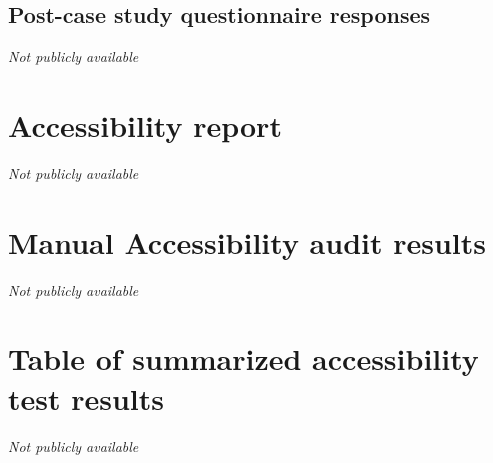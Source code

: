 \documentclass{master_thesis}
\begin{document}
\subsection{Post-case study questionnaire responses}\label{appendix:post-survey-responses}
\textit{Not publicly available}

\section{Accessibility report}\label{appendix:report}
\textit{Not publicly available}

\section{Manual Accessibility audit results}\label{appendix:manual-audit}
\textit{Not publicly available}

\section{Table of summarized accessibility test results}\label{appendix:results-table}
\textit{Not publicly available}
\end{document}
